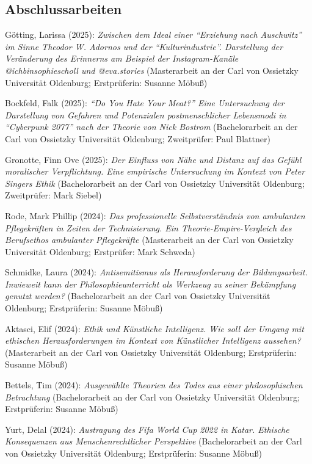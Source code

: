 \documentclass[a4paper,10pt]{article}
\newenvironment{literature}{%
   \parskip6pt\parindent0pt\raggedright
   \def\lititem{\hangindent=1cm\hangafter1}}{%
   \par\ignorespaces}
\begin{document}
\subsection*{Abschlussarbeiten}
\begin{literature}
\lititem Götting, Larissa (2025): \textit{Zwischen dem Ideal einer \enquote{Erziehung nach Auschwitz} im Sinne Theodor W. Adornos und der \enquote{Kulturindustrie}. Darstellung der Veränderung des Erinnerns am Beispiel der Instagram-Kanäle @ichbinsophiescholl und @eva.stories} (Masterarbeit an der Carl von Ossietzky Universität Oldenburg; Erstprüferin: Susanne Möbuß)

\lititem Bockfeld, Falk (2025): \textit{\enquote{Do You Hate Your Meat?} Eine Untersuchung der Darstellung von Gefahren und Potenzialen postmenschlicher Lebensmodi in \enquote{Cyberpunk 2077} nach der Theorie von Nick Bostrom} (Bachelorarbeit an der Carl von Ossietzky Universität Oldenburg; Zweitprüfer: Paul Blattner)

\lititem Gronotte, Finn Ove (2025): \textit{Der Einfluss von Nähe und Distanz auf das Gefühl moralischer Verpflichtung. Eine empirische Untersuchung im Kontext von Peter Singers Ethik} (Bachelorarbeit an der Carl von Ossietzky Universität Oldenburg; Zweitprüfer: Mark Siebel)

\lititem Rode, Mark Phillip (2024): \textit{Das professionelle Selbstverständnis von ambulanten Pflegekräften in Zeiten der Technisierung. Ein Theorie-Empire-Vergleich des Berufsethos ambulanter Pflegekräfte} (Masterarbeit an der Carl von Ossietzky Universität Oldenburg; Erstprüfer: Mark Schweda)

\lititem Schmidke, Laura (2024): \textit{Antisemitismus als Herausforderung der Bildungsarbeit. Inwieweit kann der Philosophieunterricht als Werkzeug zu seiner Bekämpfung genutzt werden?} (Bachelorarbeit an der Carl von Ossietzky Universität Oldenburg; Erstprüferin: Susanne Möbuß)

\lititem Aktasci, Elif (2024): \textit{Ethik und Künstliche Intelligenz. Wie soll der Umgang mit ethischen Herausforderungen im Kontext von Künstlicher Intelligenz aussehen?} (Masterarbeit an der Carl von Ossietzky Universität Oldenburg; Erstprüferin: Susanne Möbuß)

\lititem Bettels, Tim (2024): \textit{Ausgewählte Theorien des Todes aus einer philosophischen Betrachtung} (Bachelorarbeit an der Carl von Ossietzky Universität Oldenburg; Erstprüferin: Susanne Möbuß)

\lititem Yurt, Delal (2024): \textit{Austragung des Fifa World Cup 2022 in Katar. Ethische Konsequenzen aus Menschenrechtlicher Perspektive} (Bachelorarbeit an der Carl von Ossietzky Universität Oldenburg; Erstprüferin: Susanne Möbuß)


\end{literature}
\end{document}
